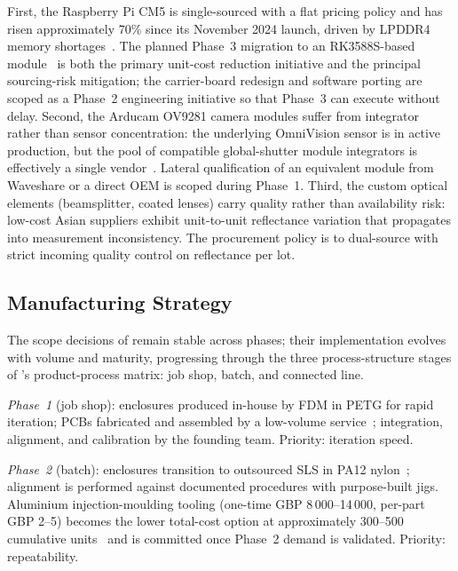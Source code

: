 First, the Raspberry Pi CM5 is single-sourced with a flat pricing policy and has risen approximately 70\% since its November 2024 launch, driven by LPDDR4 memory shortages~\cite{rpi-cm5-source}. The planned Phase~3 migration to an RK3588S-based module~\cite{orangepi-cm5-source} is both the primary unit-cost reduction initiative and the principal sourcing-risk mitigation; the carrier-board redesign and software porting are scoped as a Phase~2 engineering initiative so that Phase~3 can execute without delay. Second, the Arducam OV9281 camera modules suffer from integrator rather than sensor concentration: the underlying OmniVision sensor is in active production, but the pool of compatible global-shutter module integrators is effectively a single vendor~\cite{arducam-ov9281-source}. Lateral qualification of an equivalent module from Waveshare or a direct OEM is scoped during Phase~1. Third, the custom optical elements (beamsplitter, coated lenses) carry quality rather than availability risk: low-cost Asian suppliers exhibit unit-to-unit reflectance variation that propagates into measurement inconsistency. The procurement policy is to dual-source with strict incoming quality control on reflectance per lot.


\subsection{Manufacturing Strategy}
\label{sec:ent-mfg-sourcing}
\label{sec:ent-manufacturing-strategy}

The scope decisions of  remain stable across phases; their implementation evolves with volume and maturity, progressing through the three process-structure stages of \citet{hayes1979process}'s product-process matrix: job shop, batch, and connected line.

\textit{Phase~1} (job shop): enclosures produced in-house by FDM in PETG for rapid iteration; PCBs fabricated and assembled by a low-volume service~\cite{jlcpcb-source}; integration, alignment, and calibration by the founding team. Priority: iteration speed.

\textit{Phase~2} (batch): enclosures transition to outsourced SLS in PA12 nylon~\cite{3dprintuk-source}; alignment is performed against documented procedures with purpose-built jigs. Aluminium injection-moulding tooling (one-time GBP 8\,000--14\,000, per-part GBP 2--5) becomes the lower total-cost option at approximately 300--500 cumulative units~\cite{modernmoulds-source} and is committed once Phase~2 demand is validated. Priority: repeatability.

